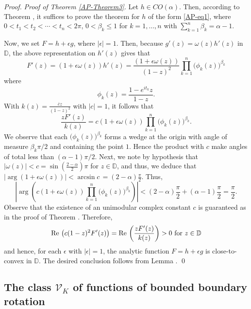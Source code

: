 \documentclass[a4paper,12pt]{amsart}
\theoremstyle{definition}
\newenvironment{pf}[1][]{ \vskip 3mm
 \noindent
 \ifthenelse{\equal{#1}{}}  {{\slshape Proof. }}  {{\slshape #1.} } }{\qed\bigskip}
\newcounter{tmp}
\begin{document}
\begin{pf}[Proof of Theorem \ref{AP-Theorem3}]
Let $h\in CO(\alpha )$. Then, according to Theorem {}, it suffices to prove the theorem for $h$ of the form \eqref{AP-eq1},
where $0 <t_1<t_2<\cdots < t _{n}<2\pi $, $0<\beta _{k}\leq 1$ for $k=1,\ldots, n$ with
$\sum\limits_{k=1}^{n}\beta _{k}=\alpha -1.$

Now, we set $F=h+\epsilon g$, where $|\epsilon| =1$.
Then, because $ g'(z)= \omega (z)h'(z)$ in ${{\mathbb D}}$, the above representation on $h'(z)$ gives that
\[F'(z)= 
(1+\epsilon\omega (z))h'(z)=\frac{(1 +\epsilon\omega (z))}{(1-z)^{2}}
\prod\limits_{k=1}^{n}\big ( \phi_k(z)\big )^{\beta _{k}}
\]
where
$$ \phi_k(z)=\frac{1-e^{it_k}z}{1-z}.
$$
With $k(z)=\frac{\overline{c}z}{(1-z)^2}$ with $|c|=1$, it follows that
\[\frac{zF'(z)}{k(z)} 
=c(1 +\epsilon \omega (z))\prod\limits_{k=1}^{n} \big ( \phi_k(z)\big )^{\beta _{k}}.
\]
We observe that each $ \big ( \phi_k(z)\big )^{\beta _{k}}$ forms a
wedge at the origin with angle of measure $\beta _{k}\pi/2 $ and containing the point $1$.
Hence the product with $c$ make angles of total less than $(\alpha -1)\pi /2$.
Next, we note by hypothesis that $|\omega (z)|<c=\sin (\frac{2-\alpha }{2})\pi $ for $z\in{{\mathbb D}}$,
and thus, we deduce that $|\arg (1+\epsilon \omega(z) )|<\arcsin c \, =(2-\alpha )\frac{\pi }{2}$.
Thus,
$$\left |\arg \left (c(1+\epsilon \omega(z))\prod\limits_{k=1}^{n} \big ( \phi_k(z)\big )^{\beta _{k}} \right )\right |<(2-\alpha )\frac{\pi }{2} +
(\alpha -1)\frac{\pi }{2} =\frac{\pi }{2}.
$$
Observe that the existence of an unimodular complex constant $c$ is guaranteed as in the proof of Theorem {}. Therefore,
$$ {\rm Re}\, \left (c (1-z)^2F'(z)\right ) = {\rm Re}\, \left (\frac{zF'(z)}{k(z)}\right ) >0 \mbox{ for $z\in{{\mathbb D}}$}
$$
and hence, for each $\epsilon$ with $|\epsilon| =1$, the analytic function $F=h+\epsilon g$
is close-to-convex in ${{\mathbb D}}$. The desired conclusion follows from Lemma {}.
\end{pf}

\subsection{The class ${\mathcal V}_K$ of functions of bounded boundary rotation}
\end{document}

